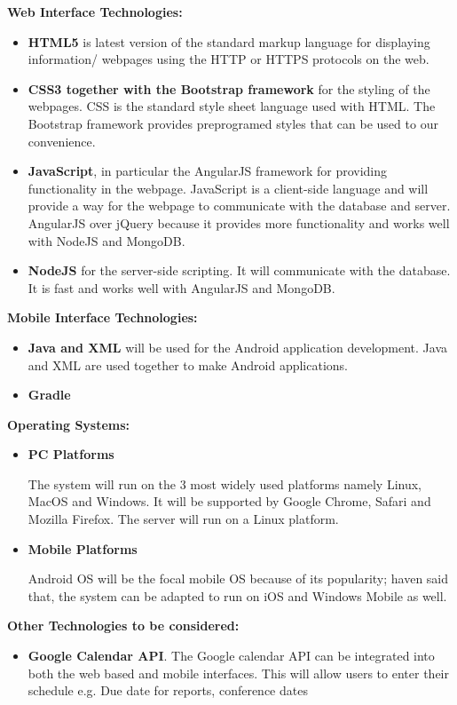 \documentclass{article}
\begin{document}
		\textbf{Web Interface Technologies:}\par
		\begin{itemize}
		
		\item \textbf{HTML5} is latest version of the standard markup language for displaying information/ webpages using the HTTP or HTTPS protocols on the web. 
\item \textbf{CSS3 together with the Bootstrap framework} for the styling of the webpages. CSS is the standard style sheet language used with HTML. The Bootstrap framework provides preprogramed styles that can be used to our convenience.
\item \textbf{JavaScript}, in particular the AngularJS framework for providing functionality in the webpage. JavaScript is a client-side language and will provide a way for the webpage to communicate with the database and server. AngularJS over jQuery because it provides more functionality and works well with NodeJS and MongoDB.
\item \textbf{NodeJS} for the server-side scripting. It will communicate with the database. It is fast and works well with AngularJS and MongoDB.
\end{itemize}

\textbf{Mobile Interface Technologies:}\par
\begin{itemize}
\item \textbf{Java and XML} will be used for the Android application development. Java and XML are used together to make Android applications.
\item \textbf{Gradle}
\end{itemize}
\textbf{Operating Systems:}\par
\begin{itemize}
\item \textbf{PC Platforms} \par
The system will run on the 3 most widely used platforms namely Linux, MacOS and Windows. It will be supported by Google Chrome, Safari and Mozilla Firefox. The server will run on a Linux platform.
\item \textbf{Mobile Platforms} \par
Android OS will be the focal mobile OS because of its popularity; haven said that, the system can be adapted to run on iOS and Windows Mobile as well.
\end{itemize}
\textbf{Other Technologies to be considered:}\par
\begin{itemize}
\item \textbf{Google Calendar API}. The Google calendar API can be integrated into both the web based and mobile interfaces. This will allow users to enter their schedule e.g. Due date for reports, conference dates
\end{itemize}
\end{document}
